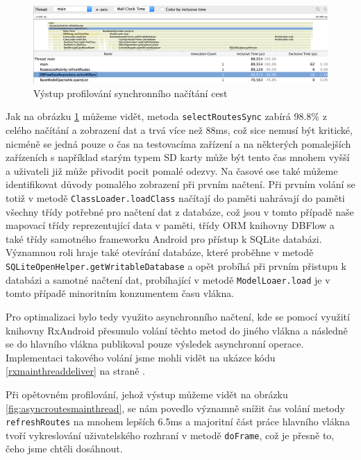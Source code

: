 \documentclass[czech,master,public,dept460,male,java,cpdeclaration]{diploma}
\begin{document}
  \begin{figure}[H]
          \centering
                  \includegraphics[scale=0.38]{img/SyncRoutesMainThread.png}
          \caption{Výstup profilování synchronního načítání cest}
          \label{fig:syncroutes}
  \end{figure}

  Jak na obrázku \ref{fig:syncroutes} můžeme vidět, metoda \texttt{selectRoutesSync} zabírá 98.8\%
  z celého načítání a zobrazení dat a trvá více než 88ms, což sice nemusí být kritické,
  nicméně se jedná pouze o čas na testovacíma zařízení a na některých pomalejších zařízeních
  s například starým typem SD karty může být tento čas mnohem vyšší a uživateli
  již může přivodit pocit pomalé odezvy. Na časové ose také můžeme identifikovat důvody pomalého
  zobrazení při prvním načtení. Při prvním volání se totiž v metodě \texttt{ClassLoader.loadClass}
  načítají do paměti nahrávají do paměti všechny třídy potřebné pro načtení dat z databáze,
  což jsou v tomto případě naše mapovací třídy reprezentující data v paměti, třídy ORM knihovny
  DBFlow a také třídy samotného frameworku Android pro přístup k SQLite databázi. Významnou
  roli hraje také otevírání databáze, které proběhne v metodě \texttt{SQLiteOpenHelper.getWritableDatabase}
  a opět probíhá při prvním přistupu k databázi a samotné načtení dat, probíhající v metodě
 \texttt{ModelLoaer.load} je v tomto případě minoritním konzumentem času vlákna.

 Pro optimalizaci bylo tedy využito asynchronního načtení, kde se pomocí využití knihovny RxAndroid
 přesunulo volání těchto metod do jiného vlákna a následně se do hlavního vlákna publikoval
 pouze výsledek asynchronní operace. Implementaci takového volání jsme mohli vidět na ukázce kódu
 \ref{rxmainthreaddeliver} na straně \pageref{rxmainthreaddeliver}.

 Při opětovném profilování, jehož výstup můžeme vidět na obrázku \ref{fig:asyncroutesmainthread},
 se nám povedlo významně snížit čas volání metody \texttt{refreshRoutes} na mnohem lepších 6.5ms
 a majoritní část práce hlavního vlákna tvoří vykreslování uživatelského rozhraní v metodě
 \texttt{doFrame}, což je přesně to, čeho jsme chtěli dosáhnout.
\end{document}
